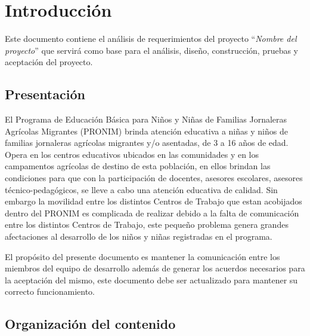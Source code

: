 
\chapter{Introducción}



Este documento contiene el análisis de requerimientos del proyecto ``{\em Nombre del proyecto}'' que servirá como base para el análisis, diseño, construcción, pruebas y aceptación del proyecto.

\section{Presentación}


El Programa de Educación Básica para Niños y Niñas de Familias Jornaleras Agrícolas Migrantes (PRONIM) brinda atención educativa a niñas y niños de familias jornaleras agrícolas migrantes y/o asentadas, de 3 a 16 años de edad. Opera en los centros educativos ubicados en las comunidades y en los campamentos agrícolas de destino de esta población, en ellos brindan las condiciones para que con la participación de docentes, asesores escolares, asesores técnico-pedagógicos, se lleve a cabo una atención educativa de calidad.
Sin embargo la movilidad entre los distintos Centros de Trabajo que estan acobijados dentro del PRONIM es complicada de realizar debido a la falta de comunicación entre los distintos Centros de Trabajo, este pequeño problema genera grandes afectaciones al desarrollo de los niños y niñas registradas en el programa.


El propósito del presente documento es mantener la comunicación entre los miembros del equipo de desarrollo además de generar los acuerdos necesarios para la aceptación del mismo, este documento debe ser actualizado para mantener su correcto funcionamiento.

\section{Organización del contenido}

